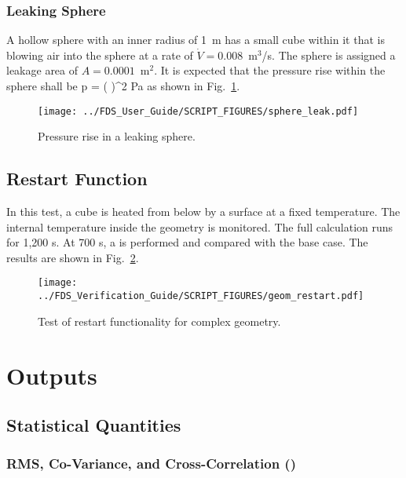 \documentclass[11pt]{book}
\begin{document}
\subsection{Leaking Sphere}
\label{sphere_leak}

A hollow sphere with an inner radius of 1~m has a small cube within it that is blowing air into the sphere at a rate of $\dot{V}=0.008$~m$^3$/s. The sphere is assigned a leakage area of $A=0.0001$~m$^2$. It is expected that the pressure rise within the sphere shall be
\be
   \Delta p =  \left(  \right)^2  \; \hbox{Pa}
\ee
as shown in Fig.~\ref{sphere_leak_fig}.
\begin{figure}[ht]
\centering
\texttt{[image: ../FDS\_User\_Guide/SCRIPT\_FIGURES/sphere\_leak.pdf]}
\caption[The  test case]{Pressure rise in a leaking sphere.}
\label{sphere_leak_fig}
\end{figure}

\section{Restart Function}
\label{geom_restart}
\label{geom_ls_restart}

In this test, a  cube is heated from below by a surface at a fixed temperature.  The internal temperature inside the geometry is monitored.  The full calculation runs for 1,200 s.  At 700 s, a  is performed and compared with the base case.  The results are shown in Fig.~\ref{fig:geom_restart}.
\begin{figure}[ht]
\centering
\texttt{[image: ../FDS\_Verification\_Guide/SCRIPT\_FIGURES/geom\_restart.pdf]}
\caption[The  test case]{Test of restart functionality for complex geometry.}
\label{fig:geom_restart}
\end{figure}

\fi


\chapter{Outputs}

\section{Statistical Quantities}

\subsection{RMS, Co-Variance, and Cross-Correlation (\texorpdfstring{}{rms\_cov\_corr})}
\end{document}
